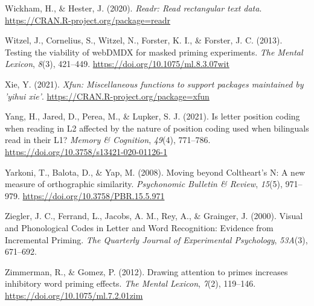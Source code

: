 \documentclass[
  english,
  man,floatsintext]{apa6}
\newlength{\cslhangindent}
\newlength{\cslentryspacingunit} %
\newenvironment{CSLReferences}[2] %
 {%
  \setlength{\parindent}{0pt}
  \ifodd #1
  \let\oldpar\par
  \def\par{\hangindent=\cslhangindent\oldpar}
  \fi
  \setlength{\parskip}{#2\cslentryspacingunit}
 }%
 {}
\begin{document}
\begin{CSLReferences}{1}{0}
\leavevmode{}%
Wickham, H., \& Hester, J. (2020). \emph{Readr: Read rectangular text data}. \url{https://CRAN.R-project.org/package=readr}

\leavevmode{}%
Witzel, J., Cornelius, S., Witzel, N., Forster, K. I., \& Forster, J. C. (2013). Testing the viability of {webDMDX} for masked priming experiments. \emph{The Mental Lexicon}, \emph{8}(3), 421--449. \url{https://doi.org/10.1075/ml.8.3.07wit}

\leavevmode{}%
Xie, Y. (2021). \emph{Xfun: Miscellaneous functions to support packages maintained by 'yihui xie'}. \url{https://CRAN.R-project.org/package=xfun}

\leavevmode{}%
Yang, H., Jared, D., Perea, M., \& Lupker, S. J. (2021). Is letter position coding when reading in L2 affected by the nature of position coding used when bilinguals read in their L1? \emph{Memory {\&} Cognition}, \emph{49}(4), 771--786. \url{https://doi.org/10.3758/s13421-020-01126-1}

\leavevmode{}%
Yarkoni, T., Balota, D., \& Yap, M. (2008). Moving beyond Coltheart{'}s N: A new measure of orthographic similarity. \emph{Psychonomic Bulletin \& Review}, \emph{15}(5), 971--979. \url{https://doi.org/10.3758/PBR.15.5.971}

\leavevmode{}%
Ziegler, J. C., Ferrand, L., Jacobs, A. M., Rey, A., \& Grainger, J. (2000). Visual and Phonological Codes in Letter and Word Recognition: Evidence from Incremental Priming. \emph{The Quarterly Journal of Experimental Psychology}, \emph{53A}(3), 671--692.

\leavevmode{}%
Zimmerman, R., \& Gomez, P. (2012). Drawing attention to primes increases inhibitory word priming effects. \emph{The Mental Lexicon}, \emph{7}(2), 119--146. \url{https://doi.org/10.1075/ml.7.2.01zim}

\end{CSLReferences}

\newpage

\endgroup


\clearpage
\end{document}
